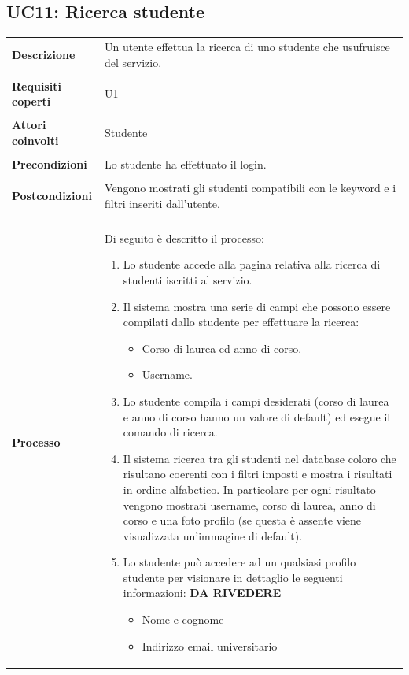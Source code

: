 \documentclass[10pt,a4paper]{report}
\begin{document}
	\subsection{UC11: Ricerca studente}
	\begin{tabular}{lp{}}
		\textbf{Descrizione}&Un utente effettua la ricerca di uno studente che usufruisce del servizio.\\
		\\
		\textbf{Requisiti coperti}&U1\\
		\\
		\textbf{Attori coinvolti}&Studente\\
		\\
		\textbf{Precondizioni}&Lo studente ha effettuato il login.\\
		\\
		\textbf{Postcondizioni}&Vengono mostrati gli studenti compatibili con le keyword e i filtri inseriti dall'utente.\\
		\\
		\textbf{Processo}&Di seguito è descritto il processo:
		\begin{enumerate}
			\item Lo studente accede alla pagina relativa alla ricerca di studenti iscritti al servizio.
			\item Il sistema mostra una serie di campi che possono essere compilati dallo studente per effettuare la ricerca:
			\begin{itemize}
				\item Corso di laurea ed anno di corso.
				\item Username.		
			\end{itemize}
			\item Lo studente compila i campi desiderati (corso di laurea e anno di corso hanno un valore di default) ed esegue il comando di ricerca.
			\item Il sistema ricerca tra gli studenti nel database coloro che risultano coerenti con i filtri imposti e mostra i risultati in ordine alfabetico. In particolare per ogni risultato vengono mostrati username, corso di laurea, anno di corso e una foto profilo (se questa è assente viene visualizzata un'immagine di default).
			\item Lo studente può accedere ad un qualsiasi profilo studente per visionare in dettaglio le seguenti informazioni: \textbf{DA RIVEDERE}
			\begin{itemize}
				\item Nome e cognome
				\item Indirizzo email universitario

\end{itemize}
\end{enumerate}
\end{tabular}
\end{document}
